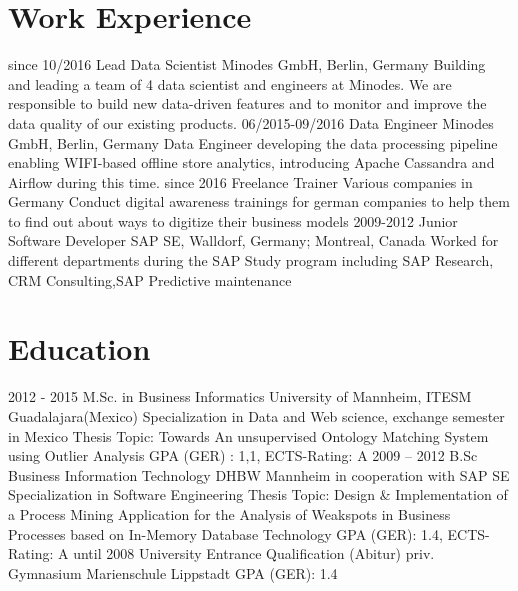 \documentclass[a4paper]{friggeri-cv}
\begin{document}
\section{Work Experience}

\begin{entrylist}
  \entry
    {since 10/2016}
    {Lead Data Scientist}
    {Minodes GmbH, Berlin, Germany}
    {Building and leading a team of 4 data scientist and engineers at Minodes. We are responsible to build new data-driven features and to monitor and improve the data quality of our existing products.}
   \entry
    {06/2015-09/2016}
    {Data Engineer}
    {Minodes GmbH, Berlin, Germany}
    {Data Engineer developing the data processing pipeline enabling WIFI-based offline store analytics, introducing Apache Cassandra and Airflow during this time.}
  \entry
    {since 2016}
    {Freelance Trainer}
    {Various companies in Germany}
    {Conduct digital awareness trainings for german companies to help them to find out about ways to digitize their business models}
  \entry
    {2009-2012}
    {Junior Software Developer}
    {SAP SE, Walldorf, Germany; Montreal, Canada}
    {Worked for different departments during the SAP Study program including SAP Research, CRM Consulting,SAP Predictive maintenance}
\end{entrylist}

\section{Education}

\begin{entrylist}
  \eduentrythesis
    {2012 - 2015}
    {M.Sc. in Business Informatics}
    {University of Mannheim, ITESM Guadalajara(Mexico)}
    {Specialization in Data and Web science, exchange semester in Mexico}
    {Thesis Topic: Towards An unsupervised Ontology Matching System using Outlier Analysis}
    {GPA (GER) : 1,1, ECTS-Rating: A}
  \eduentrythesis
    {2009 – 2012}
    {B.Sc Business Information Technology}
    {DHBW Mannheim in cooperation with SAP SE}
    {Specialization in Software Engineering}
    {Thesis Topic: Design \& Implementation of a Process Mining Application for the Analysis of Weakspots in Business Processes based on In-Memory Database Technology}
    {GPA (GER): 1.4, ECTS-Rating: A}
  \entry
    {until 2008}
    {University Entrance Qualification (Abitur)}
    {priv. Gymnasium Marienschule Lippstadt}
    {GPA (GER): 1.4}
\end{entrylist}
\end{document}
